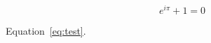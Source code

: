 \documentclass{article}
\begin{document}
\begin{equation}
e^{i\pi}+1=0
\label{eq:test}
\end{equation}

Equation~\ref{eq:test}.
\end{document}
